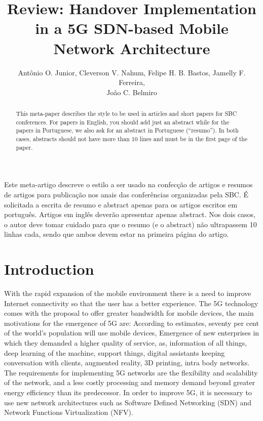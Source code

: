 \documentclass[12pt]{article}
\title{Review: Handover Implementation in a 5G SDN-based Mobile Network Architecture}
\author{Antônio O. Junior\inst{1}, Cleverson V. Nahum\inst{1}, Felipe H. B. Bastos\inst{1}, Jamelly F. Ferreira\inst{1}, \\João C. Belmiro\inst{1} }
\begin{document}
 

\maketitle

\begin{abstract}
  This meta-paper describes the style to be used in articles and short papers
  for SBC conferences. For papers in English, you should add just an abstract
  while for the papers in Portuguese, we also ask for an abstract in
  Portuguese (``resumo''). In both cases, abstracts should not have more than
  10 lines and must be in the first page of the paper.
\end{abstract}
     
\begin{resumo} 
  Este meta-artigo descreve o estilo a ser usado na confecção de artigos e
  resumos de artigos para publicação nos anais das conferências organizadas
  pela SBC. É solicitada a escrita de resumo e abstract apenas para os artigos
  escritos em português. Artigos em inglês deverão apresentar apenas abstract.
  Nos dois casos, o autor deve tomar cuidado para que o resumo (e o abstract)
  não ultrapassem 10 linhas cada, sendo que ambos devem estar na primeira
  página do artigo.
\end{resumo}


\section{Introduction}
With the rapid expansion of the mobile environment there is a need to improve Internet connectivity so that the user has a better experience. The 5G technology comes with the proposal to offer greater bandwidth for mobile devices, the main motivations for the emergence of 5G are: According to estimates, seventy per cent of the world's population will use mobile devices, Emergence of new enterprises in which they demanded a higher quality of service, as, information of all things, deep learning of the machine, support things, digital assistants keeping conversation with clients, augmented reality, 3D printing, intra body networks. The requirements for implementing 5G networks are the flexibility and scalability of the network, and a less costly processing and memory demand beyond greater energy efficiency than its predecessor. In order to improve 5G, it is necessary to use new network architectures such as Software Defined Networking (SDN) and Network Functions Virtualization (NFV).
\end{document}
